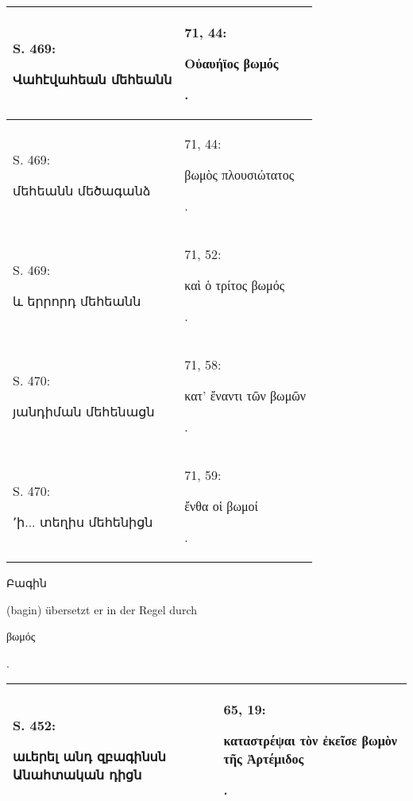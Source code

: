 \documentclass{article}
\begin{document}
{\begin{table}[H]
\begin{tabular}{p{45mm}|p{45mm}}
        S. 469: \begin{armenian}Վահէվահեան մեհեանն\end{armenian} & 71, 44: \begin{greek}Οὐαυήϊος βωμός\end{greek}.   \\ \hline
        S. 469: \begin{armenian}մեհեանն մեծագանձ\end{armenian} & 71, 44: \begin{greek}βωμὸς πλουσιώτατος\end{greek}.   \\ \hline
        S. 469: \begin{armenian}և երրորդ մեհեանն\end{armenian} & 71, 52: \begin{greek}καὶ ὁ τρίτος βωμός\end{greek}.   \\ \hline
        S. 470: \begin{armenian}յանդիման մեհենացն\end{armenian} & 71, 58: \begin{greek}κατ' ἔναντι τῶν βωμῶν\end{greek}.   \\ \hline
        S. 470: \begin{armenian}՚ի... տեղիս մեհենիցն\end{armenian} & 71, 59: \begin{greek}ἔνθα οἱ βωμοί\end{greek}. \\ \hline
    \end{tabular}
\end{table}
\hspace*{5mm}\begin{armenian}Բագին\end{armenian} (bagin) übersetzt er in der Regel durch \begin{greek}βωμός\end{greek}.  
\begin{table}[H]
    \centering
    \color{armeniaRed}
    \footnotesize
    \bfseries
    \begin{tabular}{p{45mm}|p{45mm}}
    \hline
        S. 452: \begin{armenian}աւերել անդ զբագինսն Անահտական դիցն\end{armenian} & 65, 19: \begin{greek}καταστρέψαι τὸν ἐκεῖσε βωμὸν τῆς Ἀρτέμιδος\end{greek}.   \\ \hline

\end{tabular}
\end{table}}
\end{document}
